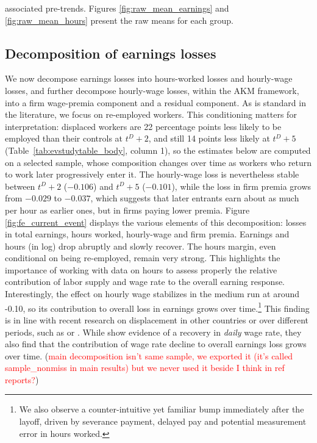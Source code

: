 associated pre-trends. Figures \ref{fig:raw_mean_earnings} and \ref{fig:raw_mean_hours} present the raw means for each group. 

\subsection{Decomposition of earnings losses}\label{sec:decomposition_losses}
We now decompose earnings losses into hours-worked losses and hourly-wage losses, and further decompose hourly-wage losses, within the AKM framework, into a firm wage-premia component and a residual component. As is standard in the literature, we focus on re-employed workers. This conditioning matters for interpretation: displaced workers are 22 percentage points less likely to be employed than their controls at $t^D+2$, and still 14 points less likely at $t^D+5$ (Table~\ref{tab:evstudytable_body}, column 1), so the estimates below are computed on a selected sample, whose composition changes over time as workers who return to work later progressively enter it. The hourly-wage loss is nevertheless stable between $t^D+2$ ($-0.106$) and $t^D+5$ ($-0.101$), while the loss in firm premia grows from $-0.029$ to $-0.037$, which suggests that later entrants earn about as much per hour as earlier ones, but in firms paying lower premia. Figure \ref{fig:fe_current_event} displays the various elements of this decomposition: losses in total earnings, hours worked, hourly-wage and firm premia. Earnings and hours (in log) drop abruptly and slowly recover. The hours margin, even conditional on being re-employed, remain very strong. This highlights the importance of working with data on hours to assess properly the relative contribution of labor supply and wage rate to the overall earning response.  Interestingly, the effect on hourly wage stabilizes in the medium run at around -0.10, so its contribution to overall loss in earnings grows over time.\footnote{We also observe a counter-intuitive yet familiar bump immediately after the layoff, driven by severance payment, delayed pay and potential measurement error in hours worked.} This finding is in line with recent research on displacement in other countries or over different periods, such as \cite{Lachowska2020} or \cite{Gulyas2019}. While \cite{Schmieder2020} show evidence of a recovery in \textit{daily} wage rate, they also find that the contribution of wage rate decline to overall earnings loss grows over time. (\textcolor{red}{main decomposition isn't same sample, we exported it (it's called sample\_nonmiss in main results) but we never used it beside I think in ref reports?})

